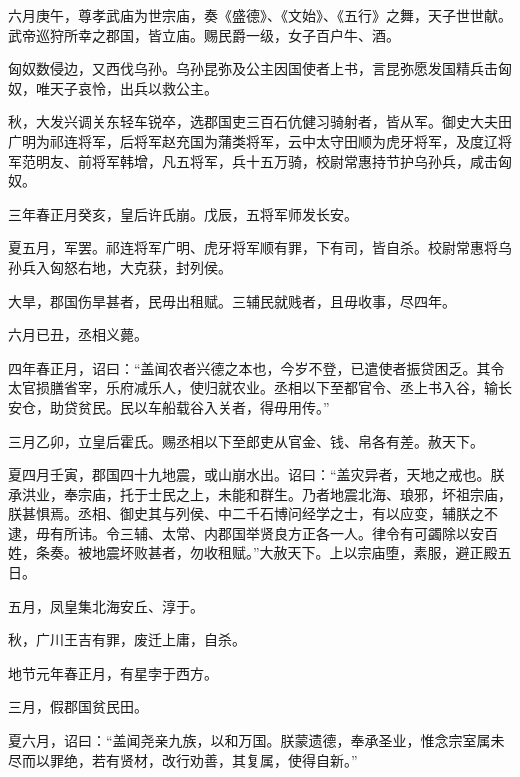 \documentclass[12pt,UTF8]{ctexbook}
\begin{document}
六月庚午，尊孝武庙为世宗庙，奏《盛德》、《文始》、《五行》之舞，天子世世献。武帝巡狩所幸之郡国，皆立庙。赐民爵一级，女子百户牛、酒。



匈奴数侵边，又西伐乌孙。乌孙昆弥及公主因国使者上书，言昆弥愿发国精兵击匈奴，唯天子哀怜，出兵以救公主。



秋，大发兴调关东轻车锐卒，选郡国吏三百石伉健习骑射者，皆从军。御史大夫田广明为祁连将军，后将军赵充国为蒲类将军，云中太守田顺为虎牙将军，及度辽将军范明友、前将军韩增，凡五将军，兵十五万骑，校尉常惠持节护乌孙兵，咸击匈奴。



三年春正月癸亥，皇后许氏崩。戊辰，五将军师发长安。



夏五月，军罢。祁连将军广明、虎牙将军顺有罪，下有司，皆自杀。校尉常惠将乌孙兵入匈怒右地，大克获，封列侯。



大旱，郡国伤旱甚者，民毋出租赋。三辅民就贱者，且毋收事，尽四年。



六月已丑，丞相义薨。



四年春正月，诏曰：“盖闻农者兴德之本也，今岁不登，已遣使者振贷困乏。其令太官损膳省宰，乐府减乐人，使归就农业。丞相以下至都官令、丞上书入谷，输长安仓，助贷贫民。民以车船载谷入关者，得毋用传。”



三月乙卯，立皇后霍氏。赐丞相以下至郎吏从官金、钱、帛各有差。赦天下。



夏四月壬寅，郡国四十九地震，或山崩水出。诏曰：“盖灾异者，天地之戒也。朕承洪业，奉宗庙，托于士民之上，未能和群生。乃者地震北海、琅邪，坏祖宗庙，朕甚惧焉。丞相、御史其与列侯、中二千石博问经学之士，有以应变，辅朕之不逮，毋有所讳。令三辅、太常、内郡国举贤良方正各一人。律令有可蠲除以安百姓，条奏。被地震坏败甚者，勿收租赋。”大赦天下。上以宗庙堕，素服，避正殿五日。



五月，凤皇集北海安丘、淳于。



秋，广川王吉有罪，废迁上庸，自杀。



地节元年春正月，有星孛于西方。



三月，假郡国贫民田。



夏六月，诏曰：“盖闻尧亲九族，以和万国。朕蒙遗德，奉承圣业，惟念宗室属未尽而以罪绝，若有贤材，改行劝善，其复属，使得自新。”
\end{document}

